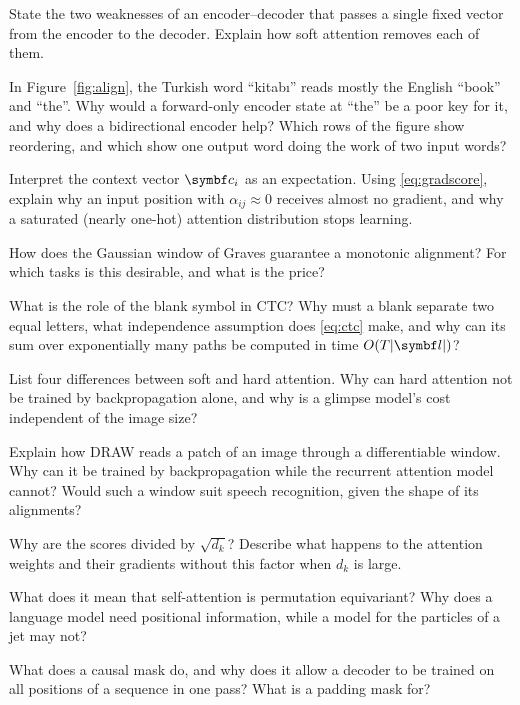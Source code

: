 \documentclass[11pt]{article}
\newcommand{\cv}{\vect{c}}
\begin{document}
\begin{questions}
\begin{conceptual}
\item State the two weaknesses of an encoder--decoder that passes a single fixed vector from the encoder to the decoder.
  Explain how soft attention removes each of them.
\item In Figure~\ref{fig:align}, the Turkish word ``kitabı'' reads mostly the English ``book'' and ``the''. Why would a
  forward-only encoder state at ``the'' be a poor key for it, and why does a bidirectional encoder help? Which rows of the
  figure show reordering, and which show one output word doing the work of two input words?
\item Interpret the context vector $\cv_i$ as an expectation. Using \eqref{eq:gradscore}, explain why an input position with $\alpha_{ij} \approx 0$ receives almost no gradient, and
  why a saturated (nearly one-hot) attention distribution stops learning.
\item How does the Gaussian window of Graves guarantee a monotonic alignment? For which tasks is this desirable, and what
  is the price?
\item What is the role of the blank symbol in CTC? Why must a blank separate two equal letters, what independence
  assumption does \eqref{eq:ctc} make, and why can its sum over exponentially many paths be computed in time
  $O(T|\vect{l}|)$?
\item List four differences between soft and hard attention. Why can hard attention not be trained by
  backpropagation alone, and why is a glimpse model's cost independent of the image size?
\item Explain how DRAW reads a patch of an image through a differentiable window. Why can it be trained by
  backpropagation while the recurrent attention model cannot? Would such a window suit speech recognition, given the shape
  of its alignments?
\item Why are the scores divided by $\sqrt{d_k}$? Describe what happens to the attention weights and their gradients without
  this factor when $d_k$ is large.
\item What does it mean that self-attention is permutation equivariant? Why does a language model need positional
  information, while a model for the particles of a jet may not?
\item What does a causal mask do, and why does it allow a decoder to be trained on all positions of a sequence in one pass?
  What is a padding mask for?

\end{conceptual}
\end{questions}
\end{document}
